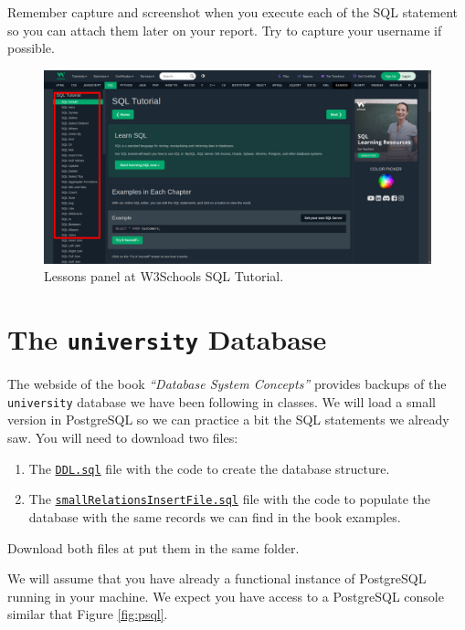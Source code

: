 \documentclass{article}
\begin{document}
Remember capture and screenshot when you execute each of the SQL statement so you can attach them later on your report.  Try to capture your username if possible.

\begin{figure}[t]
 \centering
 \includegraphics[width=\textwidth]{figures/panel}
 \caption{Lessons panel at W3Schools SQL Tutorial.}
 \label{fig:panel}
\end{figure}

\section{The \texttt{university} Database}
The webside of the book \textit{``Database System Concepts''} provides backups of the \texttt{university} database we have been following in classes.  We will load a small version in PostgreSQL so we can practice a bit the SQL statements we already saw.  You will need to download two files:

\begin{enumerate}
  \item The \href{https://db-book.com/university-lab-dir/sample_tables-dir/DDL.sql}{\texttt{DDL.sql}} file with the code to create the database structure.
  \item The \href{https://db-book.com/university-lab-dir/sample_tables-dir/smallRelations/smallRelationsInsertFile.sql} {\texttt{smallRelationsInsertFile.sql}} file with the code to populate the database with the same records we can find in the book examples.
\end{enumerate}

Download both files at put them in the same folder.

We will assume that you have already a functional instance of PostgreSQL running in your machine.  We expect you have access to a PostgreSQL console similar that Figure \ref{fig:psql}.
\end{document}
